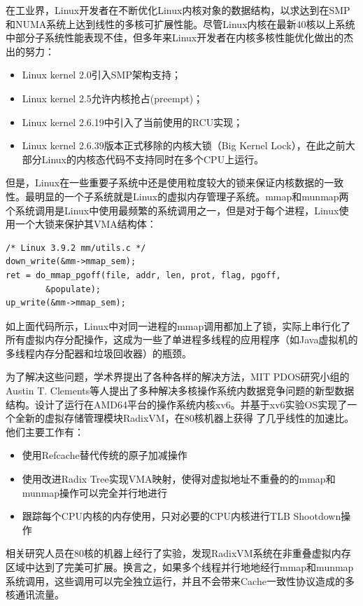 在工业界，Linux开发者在不断优化Linux内核对象的数据结构，以求达到在SMP和NUMA系统上达到线性的多核可扩展性能。尽管Linux内核在最新40核以上系统中部分子系统性能表现不佳，但多年来Linux开发者在内核多核性能优化做出的杰出的努力：

\begin{itemize}
\item Linux kernel 2.0引入SMP架构支持；
\item Linux kernel 2.5允许内核抢占(preempt)；
\item Linux kernel 2.6.19中引入了当前使用的RCU实现；
\item Linux kernel 2.6.39版本正式移除的内核大锁（Big Kernel
Lock），在此之前大部分Linux的内核态代码不支持同时在多个CPU上运行。
\end{itemize}

但是，Linux在一些重要子系统中还是使用粒度较大的锁来保证内核数据的一致性。最明显的一个子系统就是Linux的虚拟内存管理子系统。mmap和munmap两个系统调用是Linux中使用最频繁的系统调用之一，但是对于每个进程，Linux使用一个大锁来保护其VMA结构体：

\begin{lstlisting}
/* Linux 3.9.2 mm/utils.c */
down_write(&mm->mmap_sem);
ret = do_mmap_pgoff(file, addr, len, prot, flag, pgoff,
		&populate);                        
up_write(&mm->mmap_sem);                               
\end{lstlisting}

如上面代码所示，Linux中对同一进程的mmap调用都加上了锁，实际上串行化了所有虚拟内存分配操作，这成为一些了单进程多线程的应用程序（如Java虚拟机的多线程内存分配器和垃圾回收器）的瓶颈。

为了解决这些问题，学术界提出了各种各样的解决方法，MIT
PDOS研究小组的Austin T. Clements等人提出了多种解决多核操作系统内数据竞争问题的新型数据结构\cite{radixvm:eurosys13}。设计了运行在AMD64平台的操作系统内核xv6。并基于xv6实验OS实现了一个全新的虚拟存储管理模块RadixVM，在80核机器上获得
了几乎线性的加速比。他们主要工作有：
\begin{itemize}
\item 使用Refcache替代传统的原子加减操作
\item 使用改进Radix
Tree实现VMA映射，使得对虚拟地址不重叠的的mmap和munmap操作可以完全并行地进行
\item 跟踪每个CPU内核的内存使用，只对必要的CPU内核进行TLB Shootdown操作
\end{itemize}

相关研究人员在80核的机器上经行了实验，发现RadixVM系统在非重叠虚拟内存区域中达到了完美可扩展。换言之，如果多个线程并行地地经行mmap和munmap系统调用，这些调用可以完全独立运行，并且不会带来Cache一致性协议造成的多核通讯流量。


